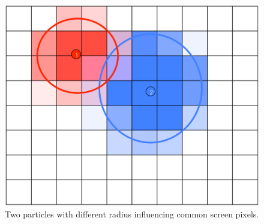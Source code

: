\documentclass[preprint,5pt]{elsarticle}
\begin{document}

\begin{figure}
\includegraphics[scale=0.1]{particles.eps}
\caption{Two particles with different radius influencing common screen pixels.}
\label{fig:particles}
\end{figure}
\end{document}
